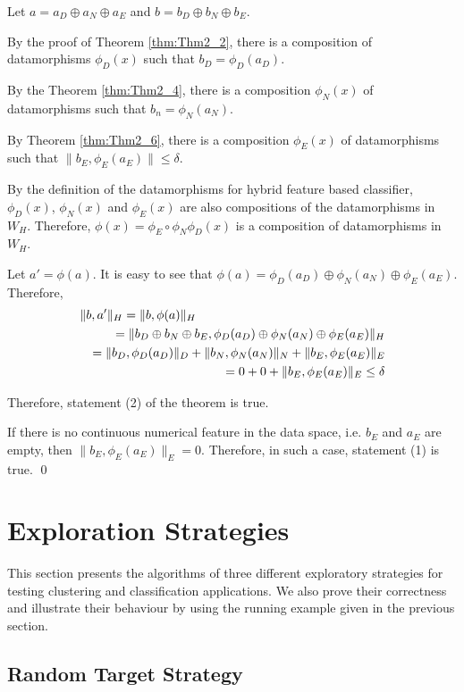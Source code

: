 \documentclass[preprint,1p,authoryear,times]{elsarticle}
\begin{document}
Let $a = a_D \oplus a_N \oplus a_E$ and $b=b_D \oplus b_N \oplus b_E$. 

By the proof of Theorem \ref{thm:Thm2_2}, there is a composition of datamorphisms $\phi_D(x)$ such that $b_D = \phi_D(a_D)$. 

By the Theorem \ref{thm:Thm2_4}, there is a composition $\phi_N(x)$ of datamorphisms such that $b_n = \phi_N(a_N)$. 

By Theorem \ref{thm:Thm2_6}, there is a composition $\phi_E(x)$ of datamorphisms such that $\|b_E, \phi_E(a_E)\| \leq \delta$. 

By the definition of the datamorphisms for hybrid feature based classifier, $\phi_D(x)$, $\phi_N(x)$ and $\phi_E(x)$ are also compositions of the datamorphisms in $W_H$. Therefore, $\phi(x) = \phi_E \circ \phi_N \phi_D(x)$ is a composition of datamorphisms in $W_H$. 

Let $a' = \phi(a)$. It is easy to see that $\phi(a) = \phi_D(a_D) \oplus \phi_N(a_N) \oplus \phi_E(a_E)$. Therefore, 
\begin{eqnarray*}
\lefteqn{\|b, a'\|_H = \|b,\phi(a)\|_H}\\
&&= \|b_D \oplus b_N \oplus b_E, \phi_D(a_D) \oplus \phi_N(a_N) \oplus \phi_E(a_E)\|_H \\
&&= \|b_D, \phi_D(a_D)\|_D + \|b_N, \phi_N(a_N)\|_N + \|b_E, \phi_E(a_E)\|_E\\
&&= 0 + 0 + \|b_E, \phi_E(a_E)\|_E \leq \delta 
\end{eqnarray*}

Therefore, statement (2) of the theorem is true. 

If there is no continuous numerical feature in the data space, i.e. $b_E$ and $a_E$ are empty, then $\|b_E, \phi_E(a_E)\|_E = 0$. Therefore, in such a case, statement (1) is true. 
\qed

\section{Exploration Strategies} \label{sect:StrategyDefinitions}

This section presents the algorithms of three different exploratory strategies for testing clustering and classification applications. We also prove their correctness and illustrate their behaviour by using the running example given in the previous section. 

\subsection{Random Target Strategy}
\end{document}
